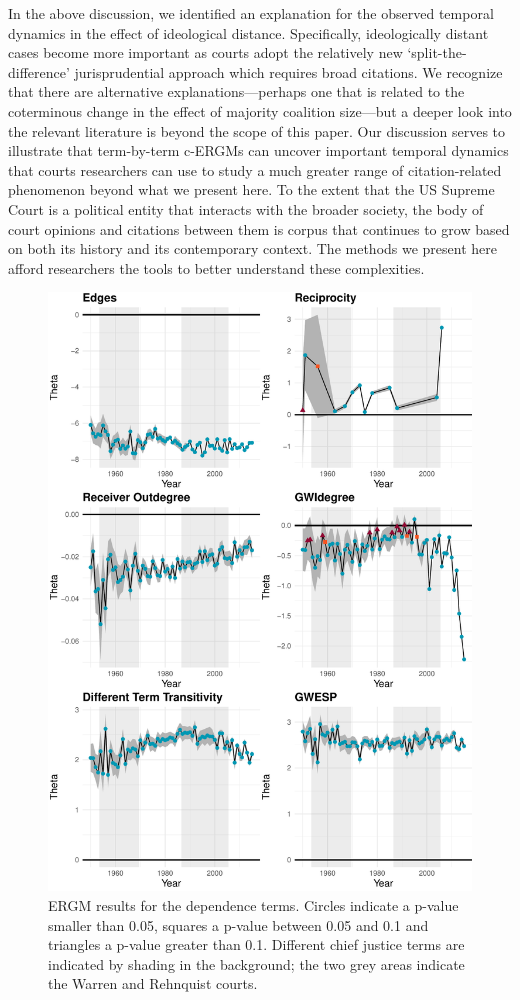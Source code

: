 \documentclass{cup-pan}
\begin{document}
In the above discussion, we identified an explanation for the observed temporal dynamics in the effect of ideological distance. Specifically, ideologically distant cases become more important as courts adopt the relatively new `split-the-difference' jurisprudential approach which requires broad citations. We recognize that there are alternative explanations---perhaps one that is related to the coterminous change in the effect of majority coalition size---but a deeper look into the relevant literature is beyond the scope of this paper. Our discussion serves to illustrate that term-by-term c-ERGMs can uncover important temporal dynamics that courts researchers can use to study a much greater range of citation-related phenomenon beyond what we present here. To the extent that the US Supreme Court is a political entity that interacts with the broader society, the body of court opinions and citations between them is corpus that continues to grow based on both its history and its contemporary context. The methods we present here afford researchers the tools to better understand these complexities.

\begin{figure}
\centering
\includegraphics[width=14cm ]{SCC_results_1.pdf}
\caption{ERGM results for the dependence terms. Circles indicate a p-value smaller than 0.05, squares a p-value between 0.05 and 0.1 and triangles a p-value greater than 0.1. Different chief justice terms are indicated by shading in the background; the two grey areas indicate the Warren and Rehnquist courts.}
 \label{SCC_results_1}
\end{figure}
\end{document}
